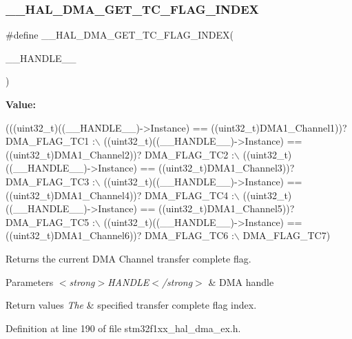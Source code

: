 \subsubsection{\texorpdfstring{\+\_\+\+\_\+\+H\+A\+L\+\_\+\+D\+M\+A\+\_\+\+G\+E\+T\+\_\+\+T\+C\+\_\+\+F\+L\+A\+G\+\_\+\+I\+N\+D\+EX}{\_\_HAL\_DMA\_GET\_TC\_FLAG\_INDEX}}
{\footnotesize\ttfamily \#define \+\_\+\+\_\+\+H\+A\+L\+\_\+\+D\+M\+A\+\_\+\+G\+E\+T\+\_\+\+T\+C\+\_\+\+F\+L\+A\+G\+\_\+\+I\+N\+D\+EX(\begin{DoxyParamCaption}\item[{}]{\+\_\+\+\_\+\+H\+A\+N\+D\+L\+E\+\_\+\+\_\+ }\end{DoxyParamCaption})}

{\bfseries Value\+:}
\begin{DoxyCode}
(((uint32\_t)((\_\_HANDLE\_\_)->Instance) == ((uint32\_t)DMA1\_Channel1))? DMA\_FLAG\_TC1 :\(\backslash\)
 ((uint32\_t)((\_\_HANDLE\_\_)->Instance) == ((uint32\_t)DMA1\_Channel2))? DMA\_FLAG\_TC2 :\(\backslash\)
 ((uint32\_t)((\_\_HANDLE\_\_)->Instance) == ((uint32\_t)DMA1\_Channel3))? DMA\_FLAG\_TC3 :\(\backslash\)
 ((uint32\_t)((\_\_HANDLE\_\_)->Instance) == ((uint32\_t)DMA1\_Channel4))? DMA\_FLAG\_TC4 :\(\backslash\)
 ((uint32\_t)((\_\_HANDLE\_\_)->Instance) == ((uint32\_t)DMA1\_Channel5))? DMA\_FLAG\_TC5 :\(\backslash\)
 ((uint32\_t)((\_\_HANDLE\_\_)->Instance) == ((uint32\_t)DMA1\_Channel6))? DMA\_FLAG\_TC6 :\(\backslash\)
   DMA\_FLAG\_TC7)
\end{DoxyCode}


Returns the current D\+MA Channel transfer complete flag. 


\begin{DoxyParams}{Parameters}
{\em $<$strong$>$\+H\+A\+N\+D\+L\+E$<$/strong$>$} & D\+MA handle \\
\hline
\end{DoxyParams}

\begin{DoxyRetVals}{Return values}
{\em The} & specified transfer complete flag index. \\
\hline
\end{DoxyRetVals}


Definition at line 190 of file stm32f1xx\+\_\+hal\+\_\+dma\+\_\+ex.\+h.

\mbox{\label{group___d_m_a___low__density___medium__density___product__devices_ga5e765bb3b1c5fc9f1b1abbbb764250bc}} 
